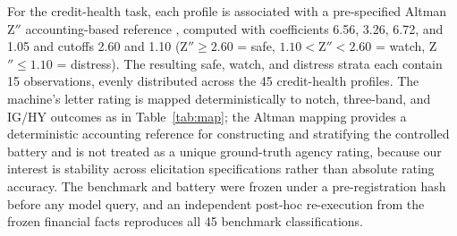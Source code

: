 \documentclass[a4paper,fleqn]{cas-sc}
\begin{document}
For the credit-health task, each profile is associated with a pre-specified Altman Z$''$ accounting-based
reference \citep{altman1968}, computed with coefficients 6.56, 3.26, 6.72, and 1.05 and cutoffs 2.60 and
1.10 (Z$''\ge2.60$ = safe, $1.10<{}$Z$''<2.60$ = watch, Z$''\le1.10$ = distress). The resulting safe,
watch, and distress strata each contain 15 observations, evenly distributed across the 45 credit-health
profiles. The machine's letter rating is mapped deterministically to notch, three-band, and IG/HY
outcomes as in Table~\ref{tab:map}; the Altman mapping provides a deterministic accounting reference for
constructing and stratifying the controlled battery and is not treated as a unique ground-truth agency
rating, because our interest is stability across elicitation specifications rather than absolute rating
accuracy. The benchmark and battery were frozen under a pre-registration hash before any model query, and
an independent post-hoc re-execution from the frozen financial facts reproduces all 45 benchmark
classifications.
\end{document}
